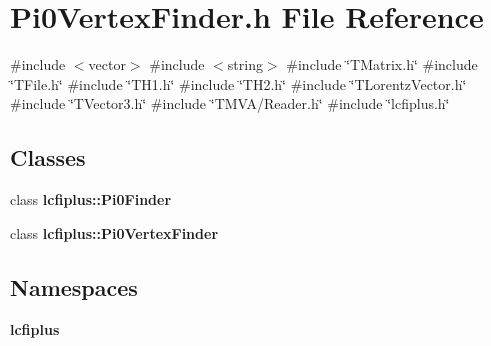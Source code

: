 \section{Pi0\+Vertex\+Finder.\+h File Reference}
\label{Pi0VertexFinder_8h}
{\ttfamily \#include $<$vector$>$}\newline
{\ttfamily \#include $<$string$>$}\newline
{\ttfamily \#include \char`\"{}T\+Matrix.\+h\char`\"{}}\newline
{\ttfamily \#include \char`\"{}T\+File.\+h\char`\"{}}\newline
{\ttfamily \#include \char`\"{}T\+H1.\+h\char`\"{}}\newline
{\ttfamily \#include \char`\"{}T\+H2.\+h\char`\"{}}\newline
{\ttfamily \#include \char`\"{}T\+Lorentz\+Vector.\+h\char`\"{}}\newline
{\ttfamily \#include \char`\"{}T\+Vector3.\+h\char`\"{}}\newline
{\ttfamily \#include \char`\"{}T\+M\+V\+A/\+Reader.\+h\char`\"{}}\newline
{\ttfamily \#include \char`\"{}lcfiplus.\+h\char`\"{}}\newline
\subsection*{Classes}
\begin{DoxyCompactItemize}
\item 
class \textbf{ lcfiplus\+::\+Pi0\+Finder}
\item 
class \textbf{ lcfiplus\+::\+Pi0\+Vertex\+Finder}
\end{DoxyCompactItemize}
\subsection*{Namespaces}
\begin{DoxyCompactItemize}
\item 
 \textbf{ lcfiplus}
\end{DoxyCompactItemize}
